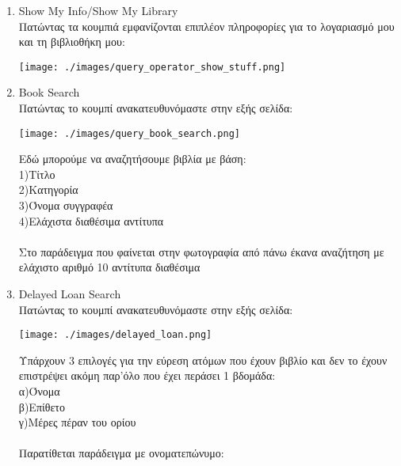 \documentclass[14pt]{report}
\begin{document}
\begin{enumerate}
		\begin{enumerate}
			\newpage
			\hypertarget{o-show-info-lib}{}
			\item Show My Info/Show My Library \\
			Πατώντας τα κουμπιά εμφανίζονται επιπλέον πληροφορίες για το λογαριασμό μου και τη βιβλιοθήκη μου: \\
			\vspace{\baselineskip}
			
			\texttt{[image: ./images/query\_operator\_show\_stuff.png]}
			
			\vspace{\baselineskip}
			
			\newpage
			\hypertarget{o-book-search}{}
			\item Book Search \\
			Πατώντας το κουμπί ανακατευθυνόμαστε στην εξής σελίδα: \\
			
			\vspace{\baselineskip}
			
			\texttt{[image: ./images/query\_book\_search.png]}
			
			\vspace{\baselineskip}
			
			Εδώ μπορούμε να αναζητήσουμε βιβλία με βάση: \\
			1)Τίτλο \\
			2)Κατηγορία \\
			3)Όνομα συγγραφέα \\
			4)Ελάχιστα διαθέσιμα αντίτυπα \\ \\
			Στο παράδειγμα που φαίνεται στην φωτογραφία από πάνω έκανα αναζήτηση με ελάχιστο αριθμό 10 αντίτυπα διαθέσιμα
			
			\newpage 
			\hypertarget{o-delayed-loans}{}
			\item Delayed Loan Search \\
			Πατώντας το κουμπί ανακατευθυνόμαστε στην εξής σελίδα: \\
			
			\vspace{\baselineskip}
			
			\texttt{[image: ./images/delayed\_loan.png]}
			
			\vspace{\baselineskip}
			
			Υπάρχουν 3 επιλογές για την εύρεση ατόμων που έχουν βιβλίο και δεν το έχουν επιστρέψει ακόμη παρ'όλο που έχει περάσει 1 βδομάδα: \\
			α)Όνομα \\
			β)Επίθετο \\
			γ)Μέρες πέραν του ορίου \\ \\
			\newpage
			Παρατίθεται παράδειγμα με ονοματεπώνυμο: \\
			

\end{enumerate}
\end{enumerate}
\end{document}
